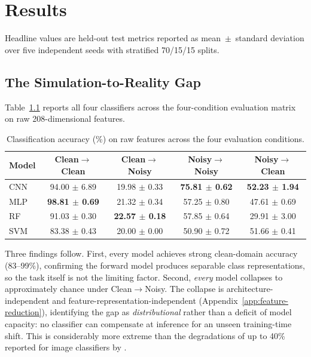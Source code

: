 \chapter{Results}
\label{ch:results}

Headline values are held-out test metrics reported as mean~$\pm$~standard deviation over five independent seeds with stratified 70/15/15 splits.

\section{The Simulation-to-Reality Gap}
\label{sec:res-main}

Table~\ref{tab:main-results-raw} reports all four classifiers across the four-condition evaluation matrix on raw 208-dimensional features.

\begin{table}[htbp]
\centering
\caption[Classification accuracy across the four evaluation conditions]{Classification accuracy (\%) on raw features across the four evaluation conditions.}
\label{tab:main-results-raw}
\small
\begin{tabular}{@{}lcccc@{}}
\toprule
\textbf{Model} & \textbf{Clean$\to$Clean} & \textbf{Clean$\to$Noisy} & \textbf{Noisy$\to$Noisy} & \textbf{Noisy$\to$Clean} \\
\midrule
CNN  & 94.00 $\pm$ 6.89 & 19.98 $\pm$ 0.33 & \textbf{75.81 $\pm$ 0.62} & \textbf{52.23 $\pm$ 1.94} \\
MLP  & \textbf{98.81 $\pm$ 0.69} & 21.32 $\pm$ 0.34 & 57.25 $\pm$ 0.80 & 47.61 $\pm$ 0.69 \\
RF   & 91.03 $\pm$ 0.30 & \textbf{22.57 $\pm$ 0.18} & 57.85 $\pm$ 0.64 & 29.91 $\pm$ 3.00 \\
SVM  & 83.38 $\pm$ 0.43 & 20.00 $\pm$ 0.00 & 50.90 $\pm$ 0.72 & 51.66 $\pm$ 0.41 \\
\bottomrule
\end{tabular}
\end{table}

Three findings follow. First, every model achieves strong clean-domain accuracy (83--99\%), confirming the forward model produces separable class representations, so the task itself is not the limiting factor. Second, \emph{every} model collapses to approximately chance under Clean$\to$Noisy. The collapse is architecture-independent and feature-representation-independent (Appendix~\ref{app:feature-reduction}), identifying the gap as \emph{distributional} rather than a deficit of model capacity: no classifier can compensate at inference for an unseen training-time shift. This is considerably more extreme than the degradations of up to 40\% reported for image classifiers by \textcite{hendrycks2019}.

